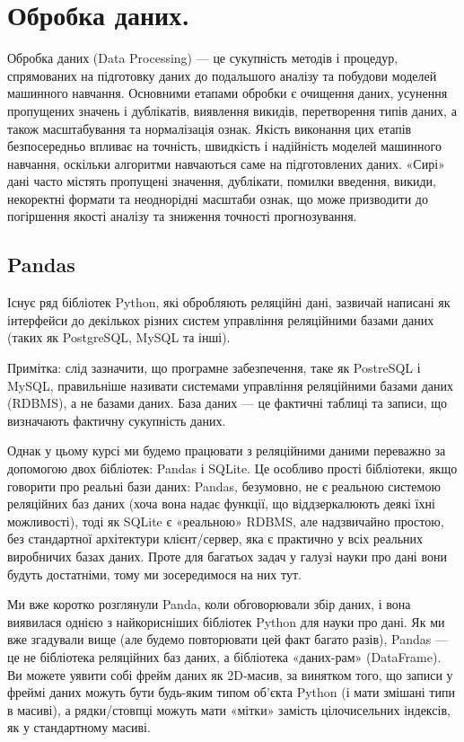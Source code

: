 \chapter{Обробка даних.}

Обробка даних (Data Processing) — це сукупність методів і процедур, спрямованих на підготовку 
даних до подальшого аналізу та побудови моделей машинного навчання. Основними етапами обробки 
є очищення даних, усунення пропущених значень і дублікатів, виявлення викидів, перетворення 
типів даних, а також масштабування та нормалізація ознак. Якість виконання цих етапів 
безпосередньо впливає на точність, швидкість і надійність моделей машинного навчання, 
оскільки алгоритми навчаються саме на підготовлених даних. «Сирі» дані часто містять 
пропущені значення, дублікати, помилки введення, викиди, некоректні формати та 
неоднорідні масштаби ознак, що може призводити до погіршення якості аналізу та зниження 
точності прогнозування.


\section{Pandas}

Існує ряд бібліотек Python, які обробляють реляційні дані, зазвичай написані як 
інтерфейси до декількох різних систем управління реляційними базами даних (таких як 
PostgreSQL, MySQL та інші). 

Примітка: слід зазначити, що програмне забезпечення, таке 
як PostreSQL і MySQL, правильніше називати системами управління реляційними базами даних 
(RDBMS), а не базами даних. База даних — це фактичні таблиці та записи, що визначають 
фактичну сукупність даних.

Однак у цьому курсі ми будемо працювати з реляційними даними переважно за допомогою 
двох бібліотек: Pandas і SQLite. Це особливо прості бібліотеки, якщо говорити про 
реальні бази даних: Pandas, безумовно, не є реальною системою реляційних баз даних 
(хоча вона надає функції, що віддзеркалюють деякі їхні можливості), тоді як SQLite 
є «реальною» RDBMS, але надзвичайно простою, без стандартної архітектури 
клієнт/сервер, яка є практично у всіх реальних виробничих базах даних. Проте для 
багатьох задач у галузі науки про дані вони будуть достатніми, тому ми зосередимося на них тут.

Ми вже коротко розглянули Panda, коли обговорювали збір даних, і вона виявилася однією 
з найкорисніших бібліотек Python для науки про дані. Як ми вже згадували вище (але 
будемо повторювати цей факт багато разів), Pandas — це не бібліотека реляційних баз 
даних, а бібліотека «даних-рам» (DataFrame). Ви можете уявити собі фрейм даних як 2D-масив, за 
винятком того, що записи у фреймі даних можуть бути будь-яким типом об'єкта Python 
(і мати змішані типи в масиві), а рядки/стовпці можуть мати «мітки» замість 
цілочисельних індексів, як у стандартному масиві.

